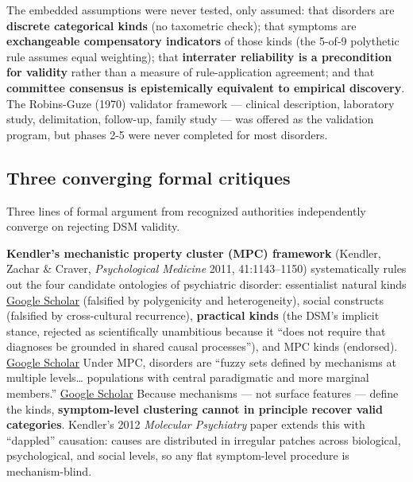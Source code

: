 The embedded assumptions were never tested, only assumed: that disorders are \textbf{discrete categorical kinds} (no taxometric check); that symptoms are \textbf{exchangeable compensatory indicators} of those kinds (the 5-of-9 polythetic rule assumes equal weighting); that \textbf{interrater reliability is a precondition for validity} rather than a measure of rule-application agreement; and that \textbf{committee consensus is epistemically equivalent to empirical discovery}. The Robins-Guze (1970) validator framework --- clinical description, laboratory study, delimitation, follow-up, family study --- was offered as the validation program, but phases 2-5 were never completed for most disorders.

\subsection{Three converging formal critiques}\label{11_dsm_iii-three-converging-formal-critiques}

Three lines of formal argument from recognized authorities independently converge on rejecting DSM validity.

\textbf{Kendler's mechanistic property cluster (MPC) framework} (Kendler, Zachar \& Craver, \emph{Psychological Medicine} 2011, 41:1143--1150) systematically rules out the four candidate ontologies of psychiatric disorder: essentialist natural kinds \href{https://scholar.google.com/scholar_lookup?title=What+kinds+of+things+are+psychiatric+disorders?&amp=&author=K.+S.+Kendler&amp=&author=P.+Zachar&amp=&author=C.+Craver&amp=&publication_year=2011&amp=&pages=1143-1150&amp=&doi=10.1017/S0033291710001844}{Google Scholar} (falsified by polygenicity and heterogeneity), social constructs (falsified by cross-cultural recurrence), \textbf{practical kinds} (the DSM's implicit stance, rejected as scientifically unambitious because it ``does not require that diagnoses be grounded in shared causal processes''), and MPC kinds (endorsed). \href{https://scholar.google.com/scholar_lookup?title=What+kinds+of+things+are+psychiatric+disorders?&amp=&author=K.+S.+Kendler&amp=&author=P.+Zachar&amp=&author=C.+Craver&amp=&publication_year=2011&amp=&pages=1143-1150&amp=&doi=10.1017/S0033291710001844}{Google Scholar} Under MPC, disorders are ``fuzzy sets defined by mechanisms at multiple levels\ldots{} populations with central paradigmatic and more marginal members.'' \href{https://scholar.google.com/scholar_lookup?title=What+kinds+of+things+are+psychiatric+disorders?&amp=&author=K.+S.+Kendler&amp=&author=P.+Zachar&amp=&author=C.+Craver&amp=&publication_year=2011&amp=&pages=1143-1150&amp=&doi=10.1017/S0033291710001844}{Google Scholar} Because mechanisms --- not surface features --- define the kinds, \textbf{symptom-level clustering cannot in principle recover valid categories}. Kendler's 2012 \emph{Molecular Psychiatry} paper extends this with ``dappled'' causation: causes are distributed in irregular patches across biological, psychological, and social levels, so any flat symptom-level procedure is mechanism-blind.

